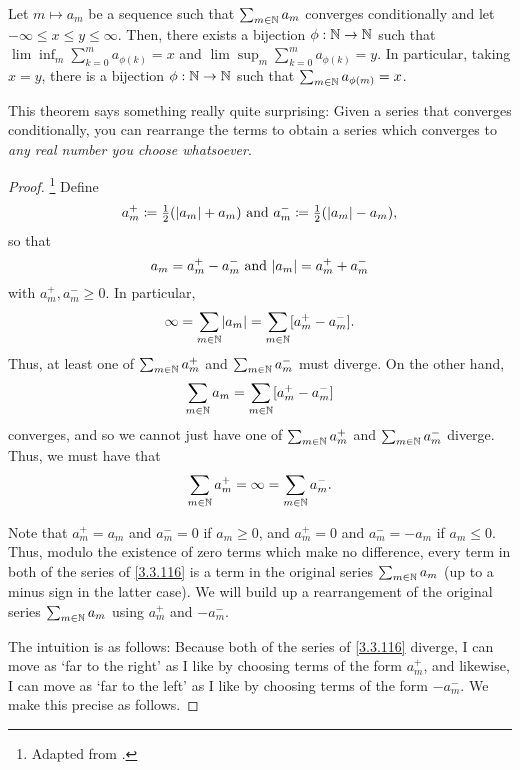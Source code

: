 \begin{thm}
Let $m\mapsto a_m$ be a sequence such that $\sum _{m\in \mathbb{N}}a_m$ converges conditionally and let $-\infty \leq x\leq y\leq \infty$.  Then, there exists a bijection $\phi :\mathbb{N} \rightarrow \mathbb{N}$ such that $\lim \inf _m\sum _{k=0}^ma_{\phi (k)}=x$ and $\lim \sup _m\sum _{k=0}^ma_{\phi (k)}=y$.  In particular, taking $x=y$, there is a bijection $\phi :\mathbb{N} \rightarrow \mathbb{N}$ such that $\sum _{m\in \mathbb{N}}a_{\phi (m)}=x$.
\begin{rmk}
This theorem says something really quite surprising:  Given a series that converges conditionally, you can rearrange the terms to obtain a series which converges to \emph{any real number you choose whatsoever}.
\end{rmk}
\begin{proof}\footnote{Adapted from \cite{Rudin}.}
Define
\begin{equation}
a_m^+\coloneqq \tfrac{1}{2}(\lvert a_m\rvert+a_m)\text{ and }a_m^-\coloneqq \tfrac{1}{2}(\lvert a_m\rvert-a_m),
\end{equation}
so that
\begin{equation}
a_m=a_m^+-a_m^-\text{ and }\lvert a_m\rvert=a_m^++a_m^-
\end{equation}
with $a_m^+,a_m^-\geq 0$.  In particular,
\begin{equation}
\infty =\sum _{m\in \mathbb{N}}\lvert a_m\rvert=\sum _{m\in \mathbb{N}}[a_m^+-a_m^-].
\end{equation}
Thus, at least one of $\sum _{m\in \mathbb{N}}a_m^+$ and $\sum _{m\in \mathbb{N}}a_m^-$ must diverge.  On the other hand,
\begin{equation}
\sum _{m\in \mathbb{N}}a_m=\sum _{m\in \mathbb{N}}[a_m^+-a_m^-]
\end{equation}
converges, and so we cannot just have one of $\sum _{m\in \mathbb{N}}a_m^+$ and $\sum _{m\in \mathbb{N}}a_m^-$ diverge.  Thus, we must have that
\begin{equation}\label{3.3.116}
\sum _{m\in \mathbb{N}}a_m^+=\infty =\sum _{m\in \mathbb{N}}a_m^-.
\end{equation}

Note that $a_m^+=a_m$ and $a_m^-=0$ if $a_m\geq 0$, and $a_m^+=0$ and $a_m^-=-a_m$ if $a_m\leq 0$.  Thus, modulo the existence of zero terms which make no difference, every term in both of the series of \eqref{3.3.116} is a term in the original series $\sum _{m\in \mathbb{N}}a_m$ (up to a minus sign in the latter case).  We will build up a rearrangement of the original series $\sum _{m\in \mathbb{N}}a_m$ using $a_m^+$ and $-a_m^-$.

The intuition is as follows:  Because both of the series of \eqref{3.3.116} diverge, I can move as `far to the right' as I like by choosing terms of the form $a_m^+$, and likewise, I can move as `far to the left' as I like by choosing terms of the form $-a_m^-$.  We make this precise as follows.


\end{proof}
\end{thm}
